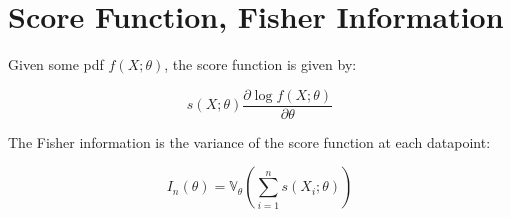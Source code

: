 \section{Score Function, Fisher Information}
Given some pdf $f(X;\theta)$, the score function is given by: 

\begin{equation}
s(X;\theta) \frac{\partial \log f(X;\theta)}{\partial \theta}
\end{equation}

The Fisher information is the variance of the score function at each datapoint:

\begin{equation}
I_n(\theta) = \mathbb{V}_{\theta} \left(\sum_{i=1}^n s(X_i ; \theta) \right)
\end{equation}


